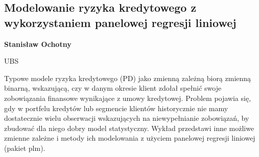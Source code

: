 \documentclass[\main/boa.tex]{subfiles}
\begin{document}
\subsection{ Modelowanie ryzyka kredytowego z wykorzystaniem panelowej regresji liniowej}

\begin{minipage}{0.915\textwidth}
	\centering
  {\bf {} Stanisław Ochotny}
\end{minipage}

\vskip 0.3cm

\begin{affiliations}
\begin{minipage}{0.915\textwidth}
\centering
UBS \\[-2pt]
\end{minipage}
\end{affiliations}

\vskip 0.8cm

Typowe modele ryzyka kredytowego (PD) jako zmienną zależną biorą zmienną binarną, wskazującą, czy w danym okresie klient zdołał spełnić swoje zobowiązania finansowe wynikające z umowy kredytowej. Problem pojawia się, gdy w portfelu kredytów lub segmencie klientów historycznie nie mamy dostatecznie wielu obserwacji wskazujących na niewypełnianie zobowiązań, by zbudować dla niego dobry model statystyczny. Wykład przedstawi inne możliwe zmienne zależne i metody ich modelowania z użyciem panelowej regresji liniowej (pakiet plm).
\end{document}
